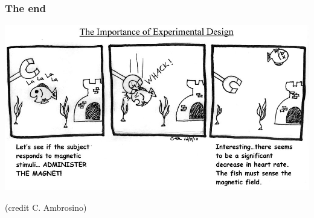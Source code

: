 \documentclass{beamer}
\begin{document}
\begin{frame}
\frametitle{The end}
\begin{center}
\includegraphics[scale = 1]{c_ambrosino.jpg}


{\tiny(credit C. Ambrosino)}
\end{center}
\end{frame}
\end{document}
